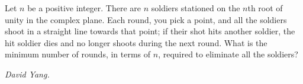 Let $n$ be a positive integer. There are $n$ soldiers stationed on the $n$th root of unity in the complex plane. Each round, you pick a point, and all the soldiers shoot in a straight line towards that point; if their shot hits another soldier, the hit soldier dies and no longer shoots during the next round. What is the minimum number of rounds, in terms of $n$, required to eliminate all the soldiers?

\textit{David Yang.}